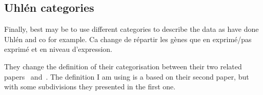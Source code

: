 \subsection{Uhlén categories}\label{sub:UhlenGeneCat}

Finally, best may be to use different categories to describe the data as have
done Uhlén and co for example. Ca change de répartir les gènes que en exprimé/pas exprimé
et en niveau d'expression.

They change the definition of their categorisation
between their two related papers~ and~.
The definition I am using is a based on their second paper,
but with some subdivisions they presented in the first one.

\pagestyle{plain}
\begin{landscape}
\begin{table}[]
\centering
\caption[Uhlén et al.\ gene categories]{\label{tab:UhlenCategoriesProtCoding}%
\textbf{Uhlén et al.\ gene categories}\\
\footnotesize{Apart the undetected genes and the ones expressed below 1 \FPKM,
a gene may be referenced in several categories.}}


\end{table}
\end{landscape}
